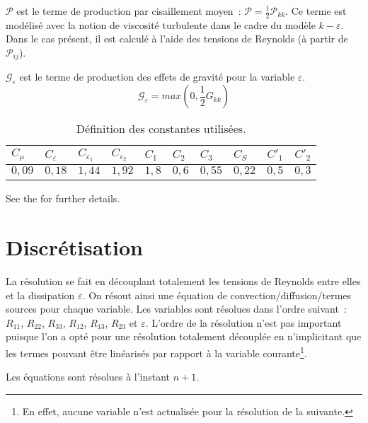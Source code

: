 $\mathcal{P}$ est le terme de production par cisaillement moyen~:
$\mathcal{P} =\displaystyle \frac{1}{2} \mathcal{P}_{kk}$. Ce terme est
modélisé avec la notion de viscosité turbulente dans le cadre du modèle
$k-\varepsilon$. Dans le cas présent, il est calculé à l'aide des tensions
de Reynolds (à partir de $\mathcal{P}_{ij}$).

$\mathcal{G}_{\varepsilon}$ est le terme de production des effets de gravité pour la variable $\varepsilon$.
\begin{equation}
\mathcal{G}_{\varepsilon} = max(0,\frac{1}{2}G_{kk})
\end{equation}
\begin{table}
{\scriptsize
\begin{center}
\begin{tabular}{|l|l|l|l|l|l|l|l|l|l|}
\hline
$C_\mu$  & $C_{\varepsilon}$  & $C_{\varepsilon_1}$ &
$C_{\varepsilon_2}$  & $C_1$ & $C_2$ & $C_3$ & $C_S$
& $C'_1$ & $C'_2$ \\
\hline
$0,09$ & $ 0,18$ & $1,44$ & $1,92$ & $1,8$ & $0,6$ & $0,55$ & $0,22$ & $0,5$ &
$0,3$ \\
\hline
\end{tabular}
\end{center}
}
\caption{Définition des constantes utilisées.}\label{Base_Turrij_table_Cstes}
\end{table}

See the  for further details.

\section*{Discrétisation}
La résolution se fait en découplant totalement les tensions de Reynolds
entre elles et la dissipation $\varepsilon$. On résout ainsi une équation de
convection/diffusion/termes sources pour chaque variable. Les variables sont
résolues dans l'ordre suivant~: $R_{11}$, $R_{22}$, $R_{33}$, $R_{12}$,
$R_{13}$, $R_{23}$ et $ \varepsilon$. L'ordre de la résolution n'est pas
important puisque l'on a opté pour une résolution totalement découplée
en n'implicitant que les termes pouvant être linéarisés par rapport à la
variable courante\footnote{En effet, aucune variable n'est actualisée pour la résolution de la suivante.}.

Les équations sont résolues à l'instant $n+1$.
